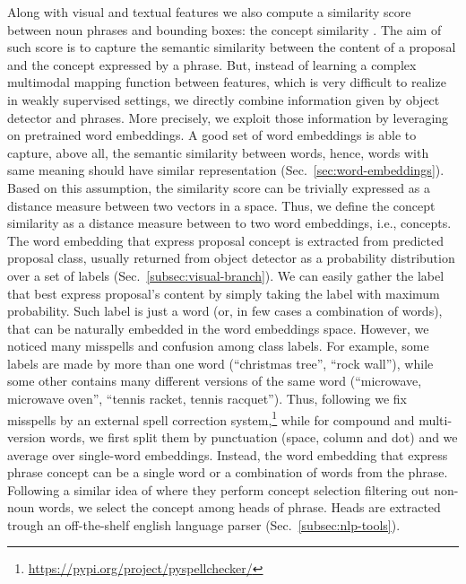 Along with visual and textual features we also compute a similarity
score between noun phrases and bounding boxes: the concept similarity
\cite{wang2019phrase}. The aim of such score is to capture the
semantic similarity between the content of a proposal and the concept
expressed by a phrase. But, instead of learning a complex multimodal
mapping function between features, which is very difficult to realize
in weakly supervised settings, we directly combine information given
by object detector and phrases. More precisely, we exploit those
information by leveraging on pretrained word embeddings. A good set of
word embeddings is able to capture, above all, the semantic similarity
between words, hence, words with same meaning should have similar
representation (Sec.~\ref{sec:word-embeddings}). Based on this
assumption, the similarity score can be trivially expressed as a
distance measure between two vectors in a space. Thus, we define the
concept similarity as a distance measure between to two word
embeddings, i.e., concepts. The word embedding that express proposal
concept is extracted from predicted proposal class, usually returned
from object detector as a probability distribution over a set of
labels (Sec.~\ref{subsec:visual-branch}). We can easily gather the
label that best express proposal's content by simply taking the label
with maximum probability. Such label is just a word (or, in few cases
a combination of words), that can be naturally embedded in the word
embeddings space. However, we noticed many misspells and confusion
among class labels. For example, some labels are made by more than one
word (``christmas tree'', ``rock wall''), while some other contains
many different versions of the same word (``microwave, microwave
oven'', ``tennis racket, tennis racquet''). Thus, following
\cite{wang2019phrase} we fix misspells by an external spell correction
system,\footnote{\href{https://pypi.org/project/pyspellchecker/}{https://pypi.org/project/pyspellchecker/}}
while for compound and multi-version words, we first split them by
punctuation (space, column and dot) and we average over single-word
embeddings. Instead, the word embedding that express phrase concept
can be a single word or a combination of words from the phrase.
Following a similar idea of \cite{javed2018learning} where they
perform concept selection filtering out non-noun words, we select the
concept among heads of phrase. Heads are extracted trough an
off-the-shelf english language parser (Sec.~\ref{subsec:nlp-tools}). 

